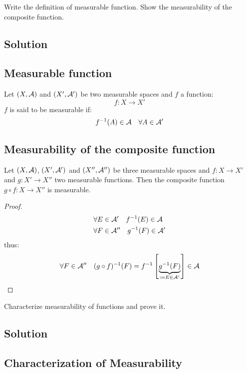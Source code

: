 \sheet


\question

Write the definition of measurable function. Show the measurability of the composite function.

\subsection*{Solution}

\subsection{Measurable function}

Let $(X,\mathcal{A})$ and $(X',\mathcal{A}')$ be two measurable spaces and $f$ a function:
\[
    f:X\to X'    
\]
$f$ is said to be measurable if:
\[
    f^{-1}(A)\in\mathcal{A}\quad\forall A\in\mathcal{A}'
\]

\subsection{Measurability of the composite function} \label{meas:comp}
Let $(X,\mathcal{A})$, $(X',\mathcal{A}')$ and $(X'',\mathcal{A}'')$ be three measurable spaces and $f:X\to X'$ and $g:X'\to X''$ two measurable functions. Then the composite function $g\circ f:X\to X''$ is measurable.

\begin{proof}
    \begin{align*}
        & \forall E \in \mathcal{A}' \quad f^{-1}(E)\in\mathcal{A} \\
        & \forall F \in \mathcal{A}'' \quad g^{-1}(F)\in\mathcal{A}' \\
    \end{align*}
    thus:
    \[
        \forall F\in \mathcal{A}'' \quad (g\circ f)^{-1}(F) = f^{-1} \left[ \underbrace{g^{-1}(F)}_{\coloneqq E \in \mathcal{A}'} \right] \in\mathcal{A}   
    \]
\end{proof}


\question

Characterize measurability of functions and prove it.

\subsection*{Solution}

\subsection{Characterization of Measurability}\label{CharMeas}

